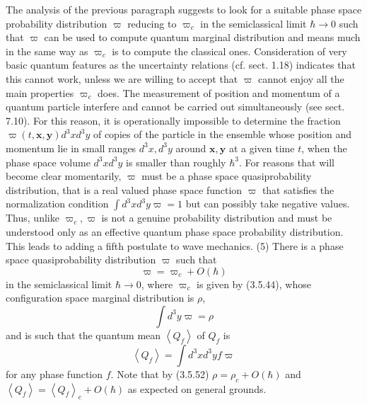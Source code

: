 \documentclass{article}
\begin{document}
The analysis of the previous paragraph suggests to look for a suitable phase space probability distribution $\varpi$ reducing to $\varpi_{c}$ in the semiclassical limit $\hbar \rightarrow 0$ such that $\varpi$ can be used to compute quantum marginal distribution and means much in the same way as $\varpi_{c}$ is to compute the classical ones. Consideration of
very basic quantum features as the uncertainty relations (cf. sect. 1.18) indicates that this cannot work, unless we are willing to accept that $\varpi$ cannot enjoy all the main properties $\varpi_{c}$ does. The measurement of position and momentum of a quantum particle interfere and cannot be carried out simultaneously (see sect. 7.10). For this reason, it is operationally impossible to determine the fraction $\varpi(t, \boldsymbol{x}, \boldsymbol{y}) d^{3} x d^{3} y$ of copies of the particle in the ensemble whose position and momentum lie in small ranges $d^{3} x, d^{3} y$ around $\boldsymbol{x}, \boldsymbol{y}$ at a given time $t$, when the phase space volume $d^{3} x d^{3} y$ is smaller than roughly $\hbar^{3}$. For reasons that will become clear momentarily, $\varpi$ must be a phase space quasiprobability distribution, that is a real valued phase space function $\varpi$ that satisfies the normalization condition $\int d^{3} x d^{3} y \varpi=1$ but can possibly take negative values. Thus, unlike $\varpi_{c}, \varpi$ is not a genuine probability distribution and must be understood only as an effective quantum phase space probability distribution. This leads to adding a fifth postulate to wave mechanics.
(5) There is a phase space quasiprobability distribution $\varpi$ such that
$$
\begin{equation*}
\varpi=\varpi_{c}+O(\hbar) \tag{3.5.52}
\end{equation*}
$$
in the semiclassical limit $\hbar \rightarrow 0$, where $\varpi_{c}$ is given by (3.5.44), whose configuration space marginal distribution is $\rho$,
$$
\begin{equation*}
\int d^{3} y \varpi=\rho \tag{3.5.53}
\end{equation*}
$$
and is such that the quantum mean $\left\langle Q_{f}\right\rangle$ of $Q_{f}$ is
$$
\begin{equation*}
\left\langle Q_{f}\right\rangle=\int d^{3} x d^{3} y f \varpi \tag{3.5.54}
\end{equation*}
$$
for any phase function $f$.
Note that by (3.5.52) $\rho=\rho_{c}+O(\hbar)$ and $\left\langle Q_{f}\right\rangle=\left\langle Q_{f}\right\rangle_{c}+O(\hbar)$ as expected on general grounds.
\end{document}
